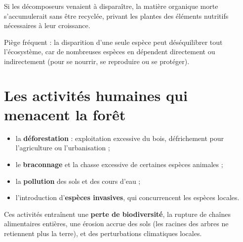 \begin{illus}
\end{illus}

\begin{exemple}
Si les décomposeurs venaient à disparaître, la matière organique morte
s'accumulerait sans être recyclée, privant les plantes des éléments nutritifs
nécessaires à leur croissance.
\end{exemple}

\begin{remarque}
Piège fréquent : la disparition d'une seule espèce peut déséquilibrer tout
l'écosystème, car de nombreuses espèces en dépendent directement ou indirectement
(pour se nourrir, se reproduire ou se protéger).
\end{remarque}

\section{Les activités humaines qui menacent la forêt}

\begin{propriete}
\begin{itemize}
\item la \textbf{déforestation} : exploitation excessive du bois, défrichement pour
l'agriculture ou l'urbanisation ;
\item le \textbf{braconnage} et la chasse excessive de certaines espèces animales ;
\item la \textbf{pollution} des sols et des cours d'eau ;
\item l'introduction d'\textbf{espèces invasives}, qui concurrencent les espèces
locales.
\end{itemize}
\end{propriete}

\begin{propriete}[Conséquences]
Ces activités entraînent une \textbf{perte de biodiversité}, la rupture de chaînes
alimentaires entières, une érosion accrue des sols (les racines des arbres ne
retiennent plus la terre), et des perturbations climatiques locales.
\end{propriete}


